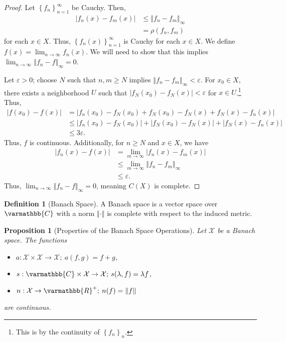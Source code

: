 \documentclass[10pt]{extarticle}
\newcommand{\R}{\mathbb{R}}
\newcommand{\C}{\mathbb{C}}
\newcommand{\norm}[1]{\left\Vert #1\right\Vert}
\newcommand{\set}[1]{\left\{#1\right\}}
\theoremstyle{plain}
\newtheorem*{proposition}{Proposition}
\theoremstyle{definition}
\newtheorem*{definition}{Definition}
\theoremstyle{note}
\renewcommand*{\mathbb}[1]{\varmathbb{#1}}
\renewcommand{\newline}{\hfill\break}
\begin{document}
\begin{proof}
  Let $\set{f_n}_{n=1}^{\infty}$ be Cauchy. Then,
  \begin{align*}
    \left\vert f_n(x) - f_m(x) \right\vert &\leq \norm{f_n - f_m}_{\infty}\\
    &= \rho(f_n,f_m)
  \end{align*}
  for each $x\in X$. Thus, $\set{f_n(x)}_{n=1}^{\infty}$ is Cauchy for each $x\in X$. We define $f(x) = \lim_{n\rightarrow \infty}f_n(x)$. We will need to show that this implies $\lim_{n\rightarrow\infty}\norm{f_n-f}_{\infty} = 0$.\newline

  Let $\varepsilon > 0$; choose $N$ such that $n,m \geq N$ implies $\norm{f_n - f_m}_{\infty} < \varepsilon$. For $x_0\in X$, there exists a neighborhood $U$ such that $\left\vert f_N(x_0) - f_N(x) \right\vert < \varepsilon$ for $x\in U$.\footnote{This is by the continuity of $\set{f_n}_n$.} Thus,
  \begin{align*}
    \left\vert f(x_0) - f(x) \right\vert &= \left\vert f_n(x_0) - f_N(x_0) + f_N(x_0) - f_N(x) + f_N(x) - f_n(x) \right\vert\\
                                         &\leq \left\vert f_n(x_0) - f_N(x_0) \right\vert + \left\vert f_N(x_0) - f_N(x) \right\vert + \left\vert f_N(x) - f_n(x) \right\vert\\
                                         &\leq 3\varepsilon.
  \end{align*}
  Thus, $f$ is continuous. Additionally, for $n\geq N$ and $x\in X$, we have
  \begin{align*}
    \left\vert f_n(x) - f(x) \right\vert &= \lim_{m\rightarrow\infty}\left\vert f_n(x) - f_m(x) \right\vert\\
                                         &\leq \lim_{m\rightarrow\infty}\norm{f_n-f_m}_{\infty}\\
                                         &\leq \varepsilon.
  \end{align*}
  Thus, $\lim_{n\rightarrow\infty}\norm{f_n - f}_{\infty} = 0$, meaning $C(X)$ is complete.
\end{proof}
\begin{definition}[Banach Space]
  A Banach space is a vector space over $\C$ with a norm $\norm{\cdot}$ is complete with respect to the induced metric.
\end{definition}
\begin{proposition}[Properties of the Banach Space Operations]
  Let $\mathcal{X}$ be a Banach space. The functions
  \begin{itemize}
    \item $a: \mathcal{X}\times \mathcal{X} \rightarrow \mathcal{X};\:a(f,g) = f+g$,
    \item $s: \C\times \mathcal{X}\rightarrow \mathcal{X};\:s(\lambda,f) = \lambda f$,
    \item $n: \mathcal{X}\rightarrow \R^{+};\:n(f) = \norm{f}$
  \end{itemize}
  are continuous.
\end{proposition}
\end{document}
